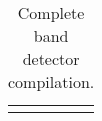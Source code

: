 \documentclass{eptcs}
\newcounter{ti}
\begin{document}
\begin{table}[ht]
\begin{sideways}
\begin{tabular}{c}
{}
\end{tabular}
\end{sideways} 
\vspace{-7ex}\caption{Complete band detector compilation.}
\label{tab:proof2}
\end{table}
\end{document}
